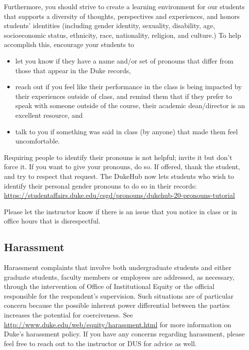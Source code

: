 \documentclass[
]{article}
\providecommand{\tightlist}{%
  \setlength{\itemsep}{0pt}\setlength{\parskip}{0pt}}
\begin{document}
Furthermore, you should strive to create a learning environment for our students that supports a diversity of thoughts, perspectives and experiences, and honors students' identities (including gender identity, sexuality, disability, age, socioeconomic status, ethnicity, race, nationality, religion, and culture.) To help accomplish this, encourage your students to

\begin{itemize}
\tightlist
\item
  let you know if they have a name and/or set of pronouns that differ from those that appear in the Duke records,
\item
  reach out if you feel like their performance in the class is being impacted by their experiences outside of class, and remind them that if they prefer to speak with someone outside of the course, their academic dean/director is an excellent resource, and
\item
  talk to you if something was said in class (by anyone) that made them feel uncomfortable.
\end{itemize}

Requiring people to identify their pronouns is not helpful; invite it but don't force it. If you want to give your pronouns, do so. If offered, thank the student, and try to respect that request. The DukeHub now lets students who wish to identify their personal gender pronouns to do so in their records: \url{https://studentaffairs.duke.edu/csgd/pronouns/dukehub-20-pronouns-tutorial}

Please let the instructor know if there is an issue that you notice in class or in office hours that is disrespectful.

\hypertarget{harassment}{%
\subsection{Harassment}\label{harassment}}

Harassment complaints that involve both undergraduate students and either graduate students, faculty members or employees are addressed, as necessary, through the intervention of Office of Institutional Equity or the official responsible for the respondent's supervision. Such situations are of particular concern because the possible inherent power differential between the parties increases the potential for coerciveness. See \url{http://www.duke.edu/web/equity/harassment.html} for more information on Duke's harassment policy. If you have any concerns regarding harassment, please feel free to reach out to the instructor or DUS for advice as well.
\end{document}
